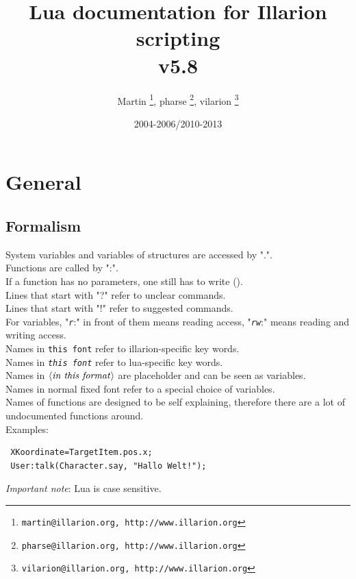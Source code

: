\documentclass[a4paper,10pt,makeidx]{scrreprt}
\newcommand{\comm}[1]{\index{#1}\texttt{#1}}
\newcommand{\var}[1]{$\left\langle \text{\emph{#1}} \right\rangle$}
\newcommand{\lua}[1]{\index{#1}\texttt{\emph{#1}}}
\begin{document}
\lstset{basicstyle=\small, keywordstyle=\ttfamily, identifierstyle=\ttfamily}
\title{Lua documentation for Illarion scripting\\v5.8}
\author{Martin \thanks{ \texttt{martin@illarion.org, http://www.illarion.org}},
pharse \thanks{ \texttt{pharse@illarion.org, http://www.illarion.org}},
vilarion \thanks{ \texttt{vilarion@illarion.org, http://www.illarion.org}}}
\date{2004-2006/2010-2013}
\maketitle
\tableofcontents
\chapter{General}
\section{Formalism}
System variables and variables of structures are accessed by ".".\\
Functions are called by ":".\\
If a function has no parameters, one still has to write ().\\
Lines that start with "?" refer to unclear commands.\\
Lines that start with "!" refer to suggested commands.\\
For variables, "\lua{r}:" in front of them means reading access, "\lua{rw}:" means reading and writing access.\\
Names in \comm{this font} refer to illarion-specific key words.\\
Names in \lua{this font} refer to lua-specific key words.\\
Names in \var{in this format} are placeholder and can be seen as variables.\\
Names in normal fixed font refer to a special choice of variables.\\
Names of functions are designed to be self explaining, therefore there are a lot of undocumented functions around.\\

Examples:\\
\begin{verbatim}
 XKoordinate=TargetItem.pos.x;
 User:talk(Character.say, "Hallo Welt!");
\end{verbatim}
\emph{Important note}: Lua is case sensitive.
\end{document}
